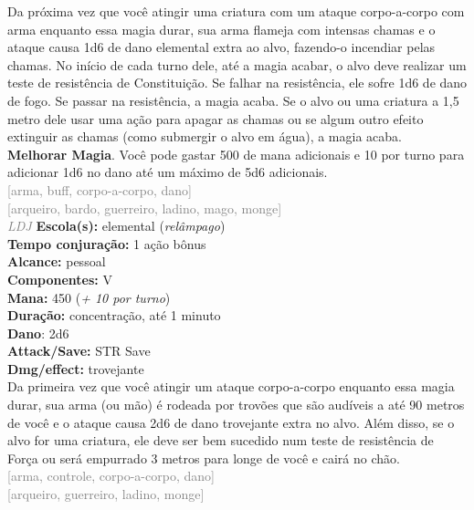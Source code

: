\documentclass{RPG_Adventure}[2021/10/20]
\begin{document}
{\normalsize Da próxima vez que você atingir uma criatura com um ataque corpo-a-corpo com arma enquanto essa magia durar, sua arma flameja com intensas chamas e o ataque causa 1d6 de dano elemental extra ao alvo, fazendo-o incendiar pelas chamas. No início de cada turno dele, até a magia acabar, o alvo deve realizar um teste de resistência de Constituição. Se falhar na resistência, ele sofre 1d6 de dano de fogo. Se passar na resistência, a magia acaba. Se o alvo ou uma criatura a 1,5 metro dele usar uma ação para apagar as chamas ou se algum outro efeito extinguir as chamas (como submergir o alvo em água), a magia acaba.\\\t \textbf{Melhorar Magia}. Você pode gastar 500 de mana adicionais e 10 por turno para adicionar 1d6 no dano até um máximo de 5d6 adicionais.\\}
{\scriptsize \textcolor{gray}{[arma, buff, corpo-a-corpo, dano]\\}}
{\scriptsize \textcolor{gray}{[arqueiro, bardo, guerreiro, ladino, mago, monge]\\}}
{\tiny \textcolor{gray}{\textit{LDJ}}}
{\small \t \textbf{Escola(s):} elemental (\textit{relâmpago})\\\t \textbf{Tempo conjuração:} 1 ação bônus\\\t \textbf{Alcance:} pessoal\\\t \textbf{Componentes:} V\\\t \textbf{Mana:} 450 (\textit{+ 10 por turno})\\\t \textbf{Duração:} concentração, até 1 minuto\\\t \textbf{Dano}: 2d6\\\t \textbf{Attack/Save:} STR Save\\\t \textbf{Dmg/effect:} trovejante\\}
{\normalsize Da primeira vez que você atingir um ataque corpo-a-corpo enquanto essa magia durar, sua arma (ou mão) é rodeada por trovões que são audíveis a até 90 metros de você e o ataque causa 2d6 de dano trovejante extra no alvo. Além disso, se o alvo for uma criatura, ele deve ser bem sucedido num teste de resistência de Força ou será empurrado 3 metros para longe de você e cairá no chão.\\}
{\scriptsize \textcolor{gray}{[arma, controle, corpo-a-corpo, dano]\\}}
{\scriptsize \textcolor{gray}{[arqueiro, guerreiro, ladino, monge]\\}}
\end{document}
